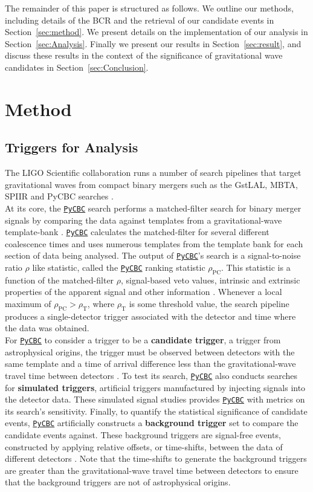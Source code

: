 \documentclass[%
preprint,
 amsmath,amssymb,
 aps,
]{revtex4}
\newcommand{\pycbc}{{\sc \href{https://pycbc.org/}{\texttt{PyCBC}}}\xspace}
\newcommand{\bcr}{{\sc BCR}\xspace}
\begin{document}
The remainder of this paper is structured as follows. We outline our methods, including details of the \bcr and the retrieval of our candidate events in Section~\ref{sec:method}. We present details on the implementation of our analysis in Section~\ref{sec:Analysis}. Finally we present our results in Section~\ref{sec:result}, and discuss these results in the context of the significance of gravitational wave candidates in Section~\ref{sec:Conclusion}.


\section{Method\label{sec:method}}

\subsection{Triggers for Analysis}
The LIGO Scientific collaboration runs a number of search pipelines that target gravitational waves from compact binary mergers such as the GstLAL, MBTA, SPIIR and PyCBC searches \cite{abbott2019gwtc}.\\

At its core, the \pycbc \cite{pycbc_code} search performs a matched-filter search for binary merger signals by comparing the data against templates from a gravitational-wave template-bank \cite{pycbc_og6}. \pycbc calculates the matched-filter for several different coalescence times and uses numerous templates from the template bank for each section of data being analysed. The output of \pycbc's search is a signal-to-noise ratio $\rho$ like statistic, called the \pycbc ranking statistic $\rho_\text{PC}$. This statistic is a function of the matched-filter $\rho$, signal-based veto values, intrinsic and extrinsic properties of the apparent signal and other information \cite{pycbc_og6}. Whenever a local maximum of $\rho_\text{PC} > \rho_\text{T}$, where $\rho_\text{T}$ is some threshold value, the search pipeline produces a single-detector trigger associated with the detector and time where the data was obtained.\\

For \pycbc to consider a trigger to be a \textbf{candidate trigger}, a trigger from astrophysical origins, the trigger must be observed between detectors with the same template and a time of arrival difference less than the gravitational-wave travel time between detectors \cite{pycbc_og6}. To test its search, \pycbc also conducts searches for \textbf{simulated triggers}, artificial triggers manufactured by injecting signals into the detector data. These simulated signal studies provides \pycbc with metrics on its search's sensitivity. Finally, to quantify the statistical significance of candidate events, \pycbc artificially constructs a \textbf{background trigger} set to compare the candidate events against. These background triggers are signal-free events, constructed by applying relative offsets, or time-shifts, between the data of different detectors \cite{pycbc_og6}. Note that the time-shifts to generate the background triggers are greater than the gravitational-wave travel time between detectors to ensure that the background triggers are not of astrophysical origins. \\
\end{document}
